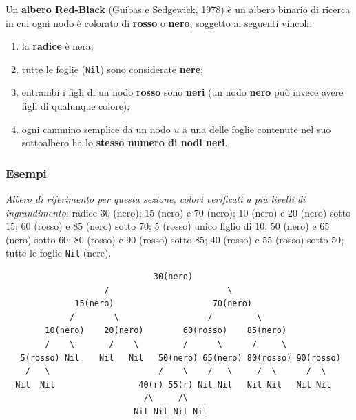 \documentclass[12pt, a4paper]{article}
\begin{document}
\begin{tcolorbox}[colback=lightergray!10, colframe=tocsec, title=\textbf{Definizione: Albero Red-Black}]
\label{def:albero-redblack}
Un \textbf{albero Red-Black} (Guibas e Sedgewick, 1978) è un albero binario di ricerca in cui ogni nodo è colorato di \textcolor{red!70!black}{\textbf{rosso}} o \textbf{nero}, soggetto ai seguenti vincoli:
\begin{enumerate}
    \item la \textbf{radice} è nera;
    \item tutte le foglie (\texttt{Nil}) sono considerate \textbf{nere};
    \item entrambi i figli di un nodo \textcolor{red!70!black}{\textbf{rosso}} sono \textbf{neri} (un nodo \textbf{nero} può invece avere figli di qualunque colore);
    \item ogni cammino semplice da un nodo $u$ a una delle foglie contenute nel suo sottoalbero ha lo \textbf{stesso numero di nodi neri}.
\end{enumerate}
\end{tcolorbox}

\subsubsection{Esempi}

\textit{Albero di riferimento per questa sezione, colori verificati a più livelli di ingrandimento}: radice $30$ (nero); $15$ (nero) e $70$ (nero); $10$ (nero) e $20$ (nero) sotto $15$; $60$ (rosso) e $85$ (nero) sotto $70$; $5$ (rosso) unico figlio di $10$; $50$ (nero) e $65$ (nero) sotto $60$; $80$ (rosso) e $90$ (rosso) sotto $85$; $40$ (rosso) e $55$ (rosso) sotto $50$; tutte le foglie \texttt{Nil} (nere).

\begin{verbatim}
                              30(nero)
                    /                        \
              15(nero)                    70(nero)
             /        \                  /         \
        10(nero)    20(nero)        60(rosso)    85(nero)
        /    \       /    \         /      \      /     \
   5(rosso) Nil    Nil   Nil   50(nero) 65(nero) 80(rosso) 90(rosso)
    /   \                      /    \    /   \     /  \      /  \
  Nil  Nil                 40(r) 55(r) Nil Nil   Nil Nil   Nil Nil
                            /\     /\
                          Nil Nil Nil Nil
\end{verbatim}
\end{document}
